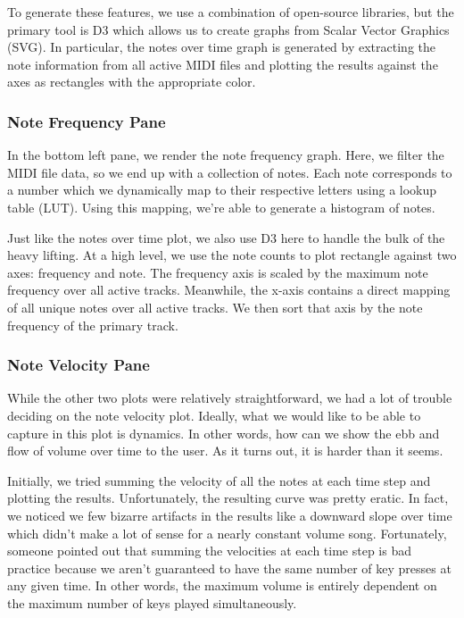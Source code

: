 \documentclass[journal]{vgtc}                %
\begin{document}
To generate these features, we use a combination of open-source libraries, but
the primary tool is D3 which allows us to create graphs from Scalar Vector
Graphics (SVG). In particular, the notes over time graph is generated by
extracting the note information from all active MIDI files and plotting the
results against the axes as rectangles with the appropriate color.

\subsubsection{Note Frequency Pane}

In the bottom left pane, we render the note frequency graph. Here, we filter
the MIDI file data, so we end up with a collection of notes. Each note
corresponds to a number which we dynamically map to their respective letters
using a lookup table (LUT). Using this mapping, we're able to generate a
histogram of notes.

Just like the notes over time plot, we also use D3 here to handle the bulk of
the heavy lifting. At a high level, we use the note counts to plot rectangle
against two axes: frequency and note. The frequency axis is scaled by the
maximum note frequency over all active tracks. Meanwhile, the x-axis
contains a direct mapping of all unique notes over all active tracks. We then
sort that axis by the note frequency of the primary track.

\subsubsection{Note Velocity Pane}

While the other two plots were relatively straightforward, we had a lot of
trouble deciding on the note velocity plot. Ideally, what we would like to be
able to capture in this plot is dynamics. In other words, how can we show
the ebb and flow of volume over time to the user. As it turns out, it is harder
than it seems.

Initially, we tried summing the velocity of all the notes at each time step and
plotting the results. Unfortunately, the resulting curve was pretty eratic. In
fact, we noticed we few bizarre artifacts in the results like a downward
slope over time which didn't make a lot of sense for a nearly constant
volume song. Fortunately, someone pointed out that summing the velocities at
each time step is bad practice because we aren't guaranteed to have the same
number of key presses at any given time. In other words, the maximum volume
is entirely dependent on the maximum number of keys played simultaneously.
\end{document}
